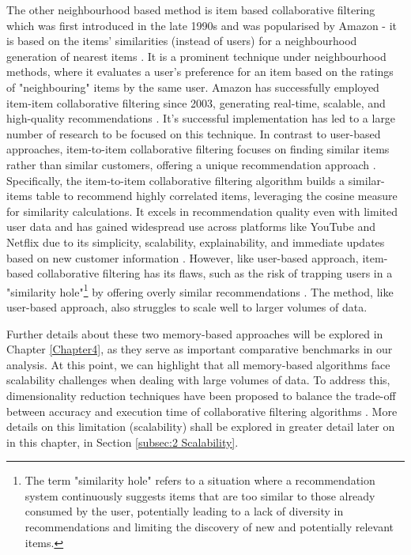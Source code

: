 The other neighbourhood based method is item based collaborative filtering which was first introduced in the late 1990s and was popularised by Amazon - it is based on the items’ similarities (instead of users) for a neighbourhood generation of nearest items \cite{sarwar2001item}. It is a prominent technique under neighbourhood methods, where it evaluates a user's preference for an item based on the ratings of "neighbouring" items by the same user. Amazon has successfully employed item-item collaborative filtering since 2003, generating real-time, scalable, and high-quality recommendations \cite{smith2017two}. It’s successful implementation has led to a large number of research to be focused on this technique. In contrast to user-based approaches, item-to-item collaborative filtering focuses on finding similar items rather than similar customers, offering a unique recommendation approach \cite{linden2003amazon}. Specifically, the item-to-item collaborative filtering algorithm builds a similar-items table to recommend highly correlated items, leveraging the cosine measure for similarity calculations. It excels in recommendation quality even with limited user data and has gained widespread use across platforms like YouTube and Netflix due to its simplicity, scalability, explainability, and immediate updates based on new customer information \cite{davidson2010youtube}. However, like user-based approach, item-based collaborative filtering has its flaws, such as the risk of trapping users in a "similarity hole"\footnote{The term "similarity hole" refers to a situation where a recommendation system continuously suggests items that are too similar to those already consumed by the user, potentially leading to a lack of diversity in recommendations and limiting the discovery of new and potentially relevant items.} by offering overly similar recommendations \cite{rashid2002getting}. The method, like user-based approach, also struggles to scale well to larger volumes of data. 

Further details about these two memory-based approaches will be explored in Chapter \ref{Chapter4}, as they serve as important comparative benchmarks in our analysis. At this point, we can highlight that all memory-based algorithms face scalability challenges when dealing with large volumes of data. To address this, dimensionality reduction techniques have been proposed to balance the trade-off between accuracy and execution time of collaborative filtering algorithms \cite{sarwar2000analysis}. More details on this limitation (scalability) shall be explored in greater detail later on in this chapter, in Section \ref{subsec:2 Scalability}.


